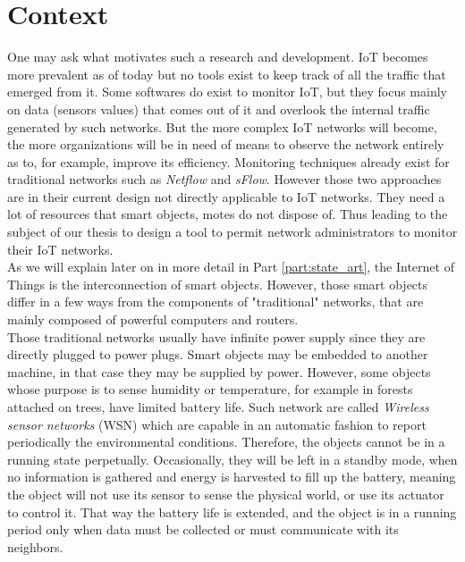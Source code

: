 \section*{Context}

One may ask what motivates such a research and development. IoT becomes more prevalent as of today but no tools exist to keep track of all the traffic that emerged from it. Some softwares do exist to monitor IoT, but they focus mainly on data (sensors values) that comes out of it and overlook the internal traffic generated by such networks. But the more complex IoT networks will become, the more organizations will be in need of means to observe the network entirely as to, for example, improve its efficiency. Monitoring techniques already exist for traditional networks such as \textit{Netflow} and \textit{sFlow}. However those two approaches are in their current design not directly applicable to IoT networks. They need a lot of resources that smart objects, motes do not dispose of. Thus leading to the subject of our thesis to design a tool to permit network administrators to monitor their IoT networks.\\

As we will explain later on in more detail in Part \ref{part:state_art}, the Internet of Things is the interconnection of smart objects. However, those smart objects differ in a few ways from the components of "traditional" networks, that are mainly composed of powerful computers and routers.\\

Those traditional networks usually have infinite power supply since they are directly plugged to power plugs. Smart objects may be embedded to another machine, in that case they may be supplied by power. However, some objects whose purpose is to sense humidity or temperature, for example in forests attached on trees, have limited battery life.  Such network are called \textit{Wireless sensor networks} (WSN) which are capable in an automatic fashion to report periodically the environmental conditions. Therefore, the objects cannot be in a running state perpetually. Occasionally, they will be left in a standby mode, when no information is gathered and energy is harvested to fill up the battery, meaning the object will not use its sensor to sense the physical world, or use its actuator to control it. That way the battery life is extended, and the object is in a running period only when data must be collected or must communicate with its neighbors. \\

